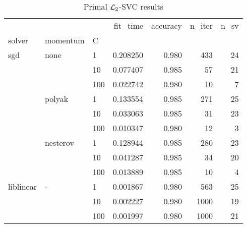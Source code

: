 \begin{table}[H]
\centering
\caption{Primal $\protect \mathcal{L}_2$-SVC results}
\label{primal_l2_svc_cv_results}
\begin{tabular}{lllrrrr}
\toprule
          &   &     &  fit\_time &  accuracy &  n\_iter &  n\_sv \\
solver & momentum & C &           &           &         &       \\
\midrule
sgd & none & 1   &  0.208250 &     0.980 &     433 &    24 \\
          &   & 10  &  0.077407 &     0.985 &      57 &    21 \\
          &   & 100 &  0.022742 &     0.980 &      10 &     7 \\
          & polyak & 1   &  0.133554 &     0.985 &     271 &    25 \\
          &   & 10  &  0.033063 &     0.985 &      31 &    23 \\
          &   & 100 &  0.010347 &     0.980 &      12 &     3 \\
          & nesterov & 1   &  0.128944 &     0.985 &     280 &    23 \\
          &   & 10  &  0.041287 &     0.985 &      34 &    20 \\
          &   & 100 &  0.013889 &     0.985 &      10 &     4 \\
liblinear & - & 1   &  0.001867 &     0.980 &     563 &    25 \\
          &   & 10  &  0.002227 &     0.980 &    1000 &    19 \\
          &   & 100 &  0.001997 &     0.980 &    1000 &    21 \\
\bottomrule
\end{tabular}
\end{table}
